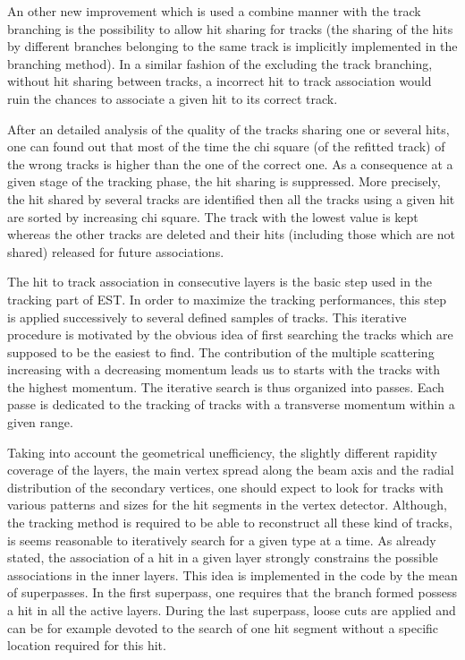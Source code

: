 \documentclass[twoside]{article}
\begin{document}
An other new improvement which is used a combine manner with the track
branching is the possibility to allow hit sharing for tracks (the
sharing of the hits by different branches belonging to the same track
is implicitly implemented in the branching method). In a similar
fashion of the excluding the track branching, without hit sharing
between tracks, a incorrect hit to track association would ruin the
chances to associate a given hit to its correct track. 

After an detailed analysis of the quality of the tracks sharing one
or several hits, one can found out that most of the time the chi
square (of the refitted track) of the wrong tracks is higher than the
one of the correct one.  As a consequence at a given stage of the
tracking phase, the hit sharing is suppressed. More precisely, the hit
shared by several tracks are identified then all the tracks using a
given hit are sorted by increasing chi square. The track with the
lowest value is kept whereas the other tracks are deleted and their
hits (including those which are not shared) released for future
associations.

The hit to track association in consecutive layers is the basic step
used in the tracking part of EST. In order to maximize the tracking
performances, this step is applied successively to several defined
samples of tracks. This iterative procedure is motivated by the
obvious idea of first searching the tracks which are supposed to be
the easiest to find. The contribution of the multiple scattering
increasing with a decreasing momentum leads us to starts with the
tracks with the highest momentum. The iterative search is thus
organized into passes. Each passe is dedicated to the tracking of
tracks with a transverse momentum within a given range.

Taking into account the geometrical unefficiency, the slightly
different rapidity coverage of the layers, the main vertex spread
along the beam axis and the radial distribution of the secondary
vertices, one should expect to look for tracks with various patterns
and sizes for the hit segments in the vertex detector. Although, the
tracking method is required to be able to reconstruct all these kind
of tracks, is seems reasonable to iteratively search for a given type
at a time. As already stated, the association of a hit in a given
layer strongly constrains the possible associations in the inner
layers. This idea is implemented in the code by the mean of
superpasses. In the first superpass, one requires that the branch
formed possess a hit in all the active layers. During the last
superpass, loose cuts are applied and can be for example devoted to
the search of one hit segment without a specific location required for
this hit.
\end{document}
